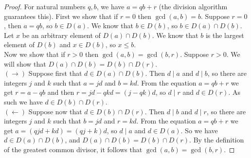 \documentclass{report}
\theoremstyle{definition}
\begin{document}
\begin{proof}
For natural numbers $q,b$, we have $a=qb+r$ (the division algorithm guarantees this). First we show that if $r=0$ then $\gcd(a,b)=b$. Suppose $r=0$, then $a=qb$, so $b\in D(a)$. We know that
$b\in D(b)$, so $b\in D(a)\cap D(b)$. Let $x$ be an arbitrary element of $D(a)\cap D(b)$. We know
that $b$ is the largest element of $D(b)$ and $x\in D(b)$, so $x\leq b$.\\
\indent Now we show that if $r>0$ then $\gcd(a,b)=\gcd(b,r)$. Suppose $r>0$. We will show that $D(a)\cap D(b)=D(b)\cap D(r)$.\\
\indent$(\rightarrow)$ Suppose first that $d\in D(a)\cap D(b)$. Then $d\mid a$ and $d\mid b$, so there are integers $j$ and $k$ such that $a=jd$ and $b=kd$. From the equation $a=qb+r$ we get
$r=a-qb$ and then $r=jd-qkd=(j-qk)d$, so $d\mid r$ and $d\in D(r)$.
As such we have $d\in D(b)\cap D(r)$.\\
\indent$(\leftarrow)$ Suppose now that $d\in D(b)\cap D(r)$. Then $d\mid b$ and $d\mid r$, so there are integers $j$ and $k$ such that $b=jd$ and $r=kd$. From the equation $a=qb+r$ we get
$a=(qjd+kd)=(qj+k)d$, so $d\mid a$ and $d\in D(a)$. So we have $d\in D(a)\cap D(b)$, and $D(a)\cap D(b)=D(b)\cap D(r)$. By the definition of the greatest common divisor, it follows that 
$\gcd(a,b)=\gcd(b,r)$.
\end{proof}
\end{document}
